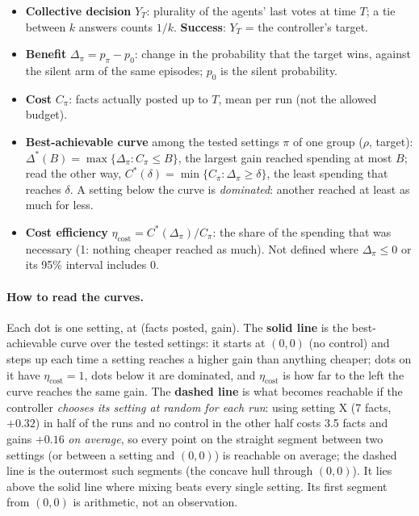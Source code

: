 \documentclass[10pt,a4paper]{article}
\begin{document}
\begin{itemize}\itemsep1pt
\item \textbf{Collective decision} $Y_T$: plurality of the agents' last votes at time $T$; a tie
  between $k$ answers counts $1/k$. \textbf{Success}: $Y_T$ = the controller's target.
\item \textbf{Benefit} $\Delta_\pi = p_\pi - p_0$: change in the probability that the target wins,
  against the silent arm of the same episodes; $p_0$ is the silent probability.
\item \textbf{Cost} $C_\pi$: facts actually posted up to $T$, mean per run (not the allowed budget).
\item \textbf{Best-achievable curve} among the tested settings $\pi$ of one group ($\rho$, target):
  $\Delta^*(B) = \max\{\Delta_\pi : C_\pi \le B\}$, the largest gain reached spending at most $B$;
  read the other way, $C^*(\delta) = \min\{C_\pi : \Delta_\pi \ge \delta\}$, the least spending that
  reaches $\delta$. A setting below the curve is \emph{dominated}: another reached at least as much for less.
\item \textbf{Cost efficiency} $\eta_{\text{cost}} = C^*(\Delta_\pi)/C_\pi$: the share of the spending that
  was necessary (1: nothing cheaper reached as much). Not defined where $\Delta_\pi \le 0$ or its
  95\% interval includes 0.
\end{itemize}

\paragraph{How to read the curves.} Each dot is one setting, at (facts posted, gain). The
\textbf{solid line} is the best-achievable curve over the tested settings: it starts at $(0,0)$ (no
control) and steps up each time a setting reaches a higher gain than anything cheaper; dots on it have
$\eta_{\text{cost}} = 1$, dots below it are dominated, and $\eta_{\text{cost}}$ is how far to the left the
curve reaches the same gain. The \textbf{dashed line} is what becomes reachable if the controller
\emph{chooses its setting at random for each run}: using setting X (7 facts, $+0.32$) in half of the
runs and no control in the other half costs 3.5 facts and gains $+0.16$ \emph{on average}, so every
point on the straight segment between two settings (or between a setting and $(0,0)$) is reachable on
average; the dashed line is the outermost such segments (the concave hull through $(0,0)$). It lies above
the solid line where mixing beats every single setting. Its first segment from $(0,0)$ is arithmetic,
not an observation.
\end{document}
